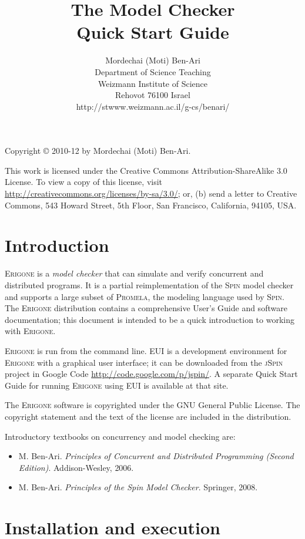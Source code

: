 \documentclass[11pt]{article}
\title{The \prg{} Model Checker\\\bigskip%
Quick Start Guide}
\author{Mordechai (Moti) Ben-Ari\\
Department of Science Teaching\\
Weizmann Institute of Science\\
Rehovot 76100 Israel\\
\textsf{http://stwww.weizmann.ac.il/g-cs/benari/}}
\newcommand*{\prg}{\textsc{Erigone}}
\newcommand*{\eui}{\textsc{EUI}}
\newcommand*{\spn}{\textsc{Spin}}
\newcommand*{\prm}{\textsc{Promela}}
\begin{document}
\maketitle
\thispagestyle{empty}

\vfill

\begin{center}
Copyright \copyright{} 2010-12 by Mordechai (Moti) Ben-Ari.
\end{center}
This work is licensed under the Creative Commons Attribution-ShareAlike 3.0
License. To view a copy of this license, visit
\url{http://creativecommons.org/licenses/by-sa/3.0/}; or, (b) send a letter
to Creative Commons, 543 Howard Street, 5th Floor, San Francisco,
California, 94105, USA.

\newpage

\section{Introduction}

\prg{} is a \emph{model checker} that can simulate and verify concurrent
and distributed programs. It is a partial reimplementation of the \spn{}
model checker and supports a large subset of \prm{}, the modeling
language used by \spn{}. The \prg{} distribution contains a
comprehensive User's Guide and software documentation; this document is
intended to be a quick introduction to working with \prg{}.

\prg{} is run from the command line. \eui{} is a development environment
for \prg{} with a graphical user interface; it can be downloaded from
the \textsc{jSpin} project in Google Code
\url{http://code.google.com/p/jspin/}. A separate Quick Start Guide for
running \prg{} using \eui{} is available at that site.

The \prg{} software is copyrighted under the \textsc{GNU}
General Public License. The copyright statement and the text of the
license are included in the distribution.

Introductory textbooks on concurrency and model checking are:

\begin{itemize}
\item M. Ben-Ari. \textit{Principles of Concurrent and Distributed
Programming (Second Edition)}. Addison-Wesley, 2006.
\item M. Ben-Ari. \textit{Principles of the Spin Model Checker}.
Springer, 2008.
\end{itemize}

\section{Installation and execution}
\end{document}
